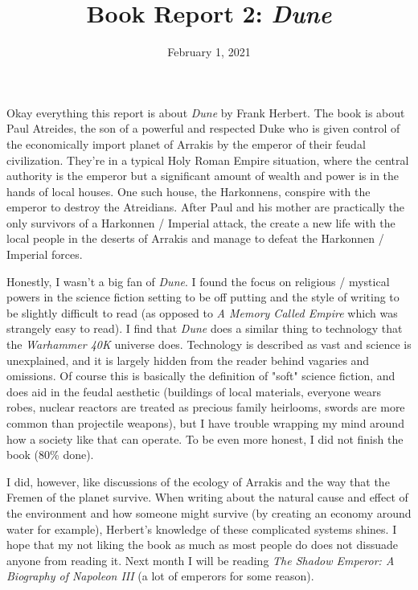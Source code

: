 \documentclass[12pt]{article}
\title{\vspace{-20mm} \textbf{Book Report 2: \emph{Dune}}}
\begin{document}
\date{February 1, 2021}
\maketitle
\thispagestyle{empty} %

Okay everything this report is about \emph{Dune} by Frank Herbert. The book is about Paul Atreides, the son of a powerful and respected Duke who is given control of the economically import planet of Arrakis by the emperor of their feudal civilization. They're in a typical Holy Roman Empire situation, where the central authority is the emperor but a significant amount of wealth and power is in the hands of local houses. One such house, the Harkonnens, conspire with the emperor to destroy the Atreidians. After Paul and his mother are practically the only survivors of a Harkonnen / Imperial attack, the create a new life with the local people in the deserts of Arrakis and manage to defeat the Harkonnen / Imperial forces. 

\vspace{5mm}

Honestly, I wasn't a big fan of \emph{Dune}. I found the focus on religious / mystical powers in the science fiction setting to be off putting and the style of writing to be slightly difficult to read (as opposed to \emph{A Memory Called Empire} which was strangely easy to read). I find that \emph{Dune} does a similar thing to technology that the \emph{Warhammer 40K} universe does. Technology is described as vast and science is unexplained, and it is largely hidden from the reader behind vagaries and omissions. Of course this is basically the definition of "soft" science fiction, and does aid in the feudal aesthetic (buildings of local materials, everyone wears robes, nuclear reactors are treated as precious family heirlooms, swords are more common than projectile weapons), but I have trouble wrapping my mind around how a society like that can operate. To be even more honest, I did not finish the book (80\% done). 

\vspace{5mm}

I did, however, like discussions of the ecology of Arrakis and the way that the Fremen of the planet survive. When writing about the natural cause and effect of the environment and how someone might survive (by creating an economy around water for example), Herbert's knowledge of these complicated systems shines. I hope that my not liking the book as much as most people do does not dissuade anyone from reading it. Next month I will be reading \emph{The Shadow Emperor: A Biography of Napoleon III} (a lot of emperors for some reason).
\end{document}
